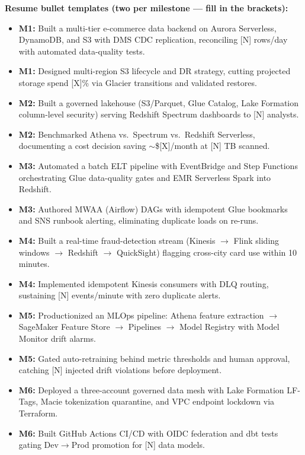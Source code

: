 \documentclass[11pt, a4paper]{article}
\begin{document}
\noindent\textbf{Resume bullet templates (two per milestone --- fill in the brackets):}
\begin{itemize}[label=-, itemsep=1pt]
    \item \textbf{M1:} Built a multi-tier e-commerce data backend on Aurora Serverless, DynamoDB, and S3 with DMS CDC replication, reconciling [N] rows/day with automated data-quality tests.
    \item \textbf{M1:} Designed multi-region S3 lifecycle and DR strategy, cutting projected storage spend [X]\% via Glacier transitions and validated restores.
    \item \textbf{M2:} Built a governed lakehouse (S3/Parquet, Glue Catalog, Lake Formation column-level security) serving Redshift Spectrum dashboards to [N] analysts.
    \item \textbf{M2:} Benchmarked Athena vs.\ Spectrum vs.\ Redshift Serverless, documenting a cost decision saving $\sim$\$[X]/month at [N] TB scanned.
    \item \textbf{M3:} Automated a batch ELT pipeline with EventBridge and Step Functions orchestrating Glue data-quality gates and EMR Serverless Spark into Redshift.
    \item \textbf{M3:} Authored MWAA (Airflow) DAGs with idempotent Glue bookmarks and SNS runbook alerting, eliminating duplicate loads on re-runs.
    \item \textbf{M4:} Built a real-time fraud-detection stream (Kinesis $\rightarrow$ Flink sliding windows $\rightarrow$ Redshift $\rightarrow$ QuickSight) flagging cross-city card use within 10 minutes.
    \item \textbf{M4:} Implemented idempotent Kinesis consumers with DLQ routing, sustaining [N] events/minute with zero duplicate alerts.
    \item \textbf{M5:} Productionized an MLOps pipeline: Athena feature extraction $\rightarrow$ SageMaker Feature Store $\rightarrow$ Pipelines $\rightarrow$ Model Registry with Model Monitor drift alarms.
    \item \textbf{M5:} Gated auto-retraining behind metric thresholds and human approval, catching [N] injected drift violations before deployment.
    \item \textbf{M6:} Deployed a three-account governed data mesh with Lake Formation LF-Tags, Macie tokenization quarantine, and VPC endpoint lockdown via Terraform.
    \item \textbf{M6:} Built GitHub Actions CI/CD with OIDC federation and dbt tests gating Dev$\rightarrow$Prod promotion for [N] data models.
\end{itemize}
\end{document}
